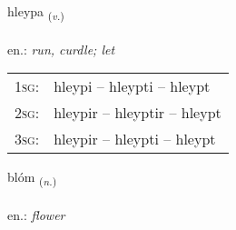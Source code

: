 \documentclass[frontgrid, backgrid]{flacards}\usepackage[]{graphicx}\usepackage[]{xcolor}
\begin{document}
\renewcommand{\blhead}{\vskip5pt {\small\bfseries\footnotesize Sagnorð | Verb }}
\renewcommand{\bcfoot}{\vskip5pt \hspace{2pt}{\small\bfseries\footnotesize 2K}}


{hleypa \small{\textsubscript{(\textit{v.})}} \\[1ex] %
\textphonetic{[l̥eiːpa]} \\
en.: \emph{run, curdle; let} \\  [2ex]
\renewcommand*{\arraystretch}{0.8}
\begin{tabular}{p{1cm}l}
\textsc{1sg}: & hleypi -- hleypti -- hleypt \\ 
\textsc{2sg}: & hleypir -- hleyptir -- hleypt \\ 
\textsc{3sg}: & hleypir -- hleypti -- hleypt \\ 
\end{tabular}
}

\renewcommand{\flhead}{\vskip5pt \fboxsep=0pt {\small\bfseries\footnotesize Nafnorð | Noun}}
\renewcommand{\fcfoot}{\vskip5pt \fboxsep=0pt \hspace{2pt}{\small\bfseries\footnotesize 2K}}

\renewcommand{\blhead}{\vskip5pt {\small\bfseries\footnotesize Nafnorð | Noun }}
\renewcommand{\bcfoot}{\vskip5pt \hspace{2pt}{\small\bfseries\footnotesize 2K}}


{blóm \small{\textsubscript{(\textit{n.})}} \\[1ex] %
\textphonetic{[plouːm]} \\
en.: \emph{flower} \\  [2ex]
\renewcommand*{\arraystretch}{0.8}
}

\renewcommand{\flhead}{\vskip5pt \fboxsep=0pt {\small\bfseries\footnotesize Sagnorð | Verb}}
\renewcommand{\fcfoot}{\vskip5pt \fboxsep=0pt \hspace{2pt}{\small\bfseries\footnotesize 2K}}
\end{document}
